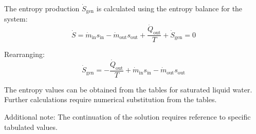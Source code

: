 The entropy production \( \dot{S}_{\text{gen}} \) is calculated using the entropy balance for the system:  
\[
\dot{S} = \dot{m}_{\text{in}} s_{\text{in}} - \dot{m}_{\text{out}} s_{\text{out}} + \frac{\dot{Q}_{\text{out}}}{T} + \dot{S}_{\text{gen}} = 0
\]  

Rearranging:  
\[
\dot{S}_{\text{gen}} = -\frac{\dot{Q}_{\text{out}}}{T} + \dot{m}_{\text{in}} s_{\text{in}} - \dot{m}_{\text{out}} s_{\text{out}}
\]  

The entropy values can be obtained from the tables for saturated liquid water. Further calculations require numerical substitution from the tables.  

Additional note: The continuation of the solution requires reference to specific tabulated values.